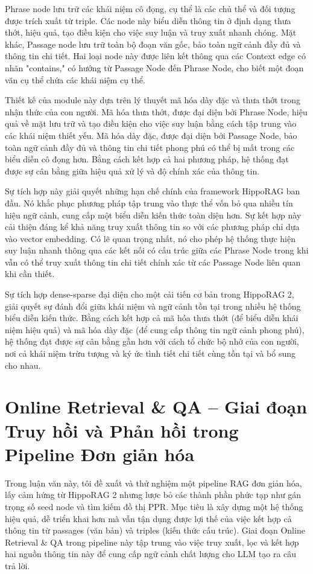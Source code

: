 \documentclass[../main.tex]{subfiles}
\begin{document}
Phrase node lưu trữ các khái niệm cô đọng, cụ thể là các chủ thể và đối tượng được trích xuất từ triple. Các node này biểu diễn thông tin ở định dạng thưa thớt, hiệu quả, tạo điều kiện cho việc suy luận và truy xuất nhanh chóng. Mặt khác, Passage node lưu trữ toàn bộ đoạn văn gốc, bảo toàn ngữ cảnh đầy đủ và thông tin chi tiết. Hai loại node này được liên kết thông qua các Context edge có nhãn "contains," có hướng từ Passage Node đến Phrase Node, cho biết một đoạn văn cụ thể chứa các khái niệm cụ thể.

Thiết kế của module này dựa trên lý thuyết mã hóa dày đặc và thưa thớt trong nhận thức của con người. Mã hóa thưa thớt, được đại diện bởi Phrase Node, hiệu quả về mặt lưu trữ và tạo điều kiện cho việc suy luận bằng cách tập trung vào các khái niệm thiết yếu. Mã hóa dày đặc, được đại diện bởi Passage Node, bảo toàn ngữ cảnh đầy đủ và thông tin chi tiết phong phú có thể bị mất trong các biểu diễn cô đọng hơn. Bằng cách kết hợp cả hai phương pháp, hệ thống đạt được sự cân bằng giữa hiệu quả xử lý và độ chính xác của thông tin.

Sự tích hợp này giải quyết những hạn chế chính của framework HippoRAG ban đầu. Nó khắc phục phương pháp tập trung vào thực thể vốn bỏ qua nhiều tín hiệu ngữ cảnh, cung cấp một biểu diễn kiến thức toàn diện hơn. Sự kết hợp này cải thiện đáng kể khả năng truy xuất thông tin so với các phương pháp chỉ dựa vào vector embedding. Có lẽ quan trọng nhất, nó cho phép hệ thống thực hiện suy luận nhanh thông qua các kết nối có cấu trúc giữa các Phrase Node trong khi vẫn có thể truy xuất thông tin chi tiết chính xác từ các Passage Node liên quan khi cần thiết.

Sự tích hợp dense-sparse đại diện cho một cải tiến cơ bản trong HippoRAG 2, giải quyết sự đánh đổi giữa khái niệm và ngữ cảnh tồn tại trong nhiều hệ thống biểu diễn kiến thức. Bằng cách kết hợp cả mã hóa thưa thớt (để biểu diễn khái niệm hiệu quả) và mã hóa dày đặc (để cung cấp thông tin ngữ cảnh phong phú), hệ thống đạt được sự cân bằng gần hơn với cách tổ chức bộ nhớ của con người, nơi cả khái niệm trừu tượng và ký ức tình tiết chi tiết cùng tồn tại và bổ sung cho nhau.

\section{Online Retrieval \& QA – Giai đoạn Truy hồi và Phản hồi trong Pipeline Đơn giản hóa}
Trong luận văn này, tôi đề xuất và thử nghiệm một pipeline RAG đơn giản hóa, lấy cảm hứng từ HippoRAG 2 nhưng lược bỏ các thành phần phức tạp như gán trọng số seed node và tìm kiếm đồ thị PPR. Mục tiêu là xây dựng một hệ thống hiệu quả, dễ triển khai hơn mà vẫn tận dụng được lợi thế của việc kết hợp cả thông tin từ passages (văn bản) và triples (kiến thức cấu trúc). Giai đoạn Online Retrieval \& QA trong pipeline này tập trung vào việc truy xuất, lọc và kết hợp hai nguồn thông tin này để cung cấp ngữ cảnh chất lượng cho LLM tạo ra câu trả lời.
\end{document}
